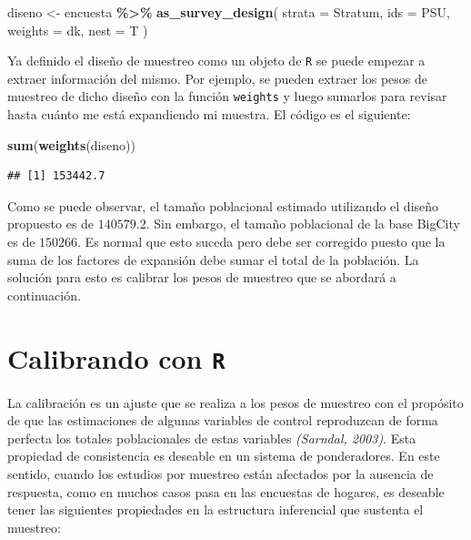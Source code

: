 \documentclass[
  spanish,
  12pt,
]{book}
\newenvironment{Shaded}{\begin{snugshade}}{\end{snugshade}}
\newcommand{\AttributeTok}[1]{\textcolor[rgb]{0.13,0.29,0.53}{#1}}
\newcommand{\FunctionTok}[1]{\textcolor[rgb]{0.13,0.29,0.53}{\textbf{#1}}}
\newcommand{\NormalTok}[1]{#1}
\newcommand{\OtherTok}[1]{\textcolor[rgb]{0.56,0.35,0.01}{#1}}
\newcommand{\SpecialCharTok}[1]{\textcolor[rgb]{0.81,0.36,0.00}{\textbf{#1}}}
\begin{document}
\begin{Shaded}
\begin{Highlighting}[]
\NormalTok{diseno }\OtherTok{\textless{}{-}}\NormalTok{ encuesta }\SpecialCharTok{\%\textgreater{}\%}
  \FunctionTok{as\_survey\_design}\NormalTok{(}
    \AttributeTok{strata =}\NormalTok{ Stratum,}
    \AttributeTok{ids =}\NormalTok{ PSU,}
    \AttributeTok{weights =}\NormalTok{ dk,}
    \AttributeTok{nest =}\NormalTok{ T}
\NormalTok{  )}
\end{Highlighting}
\end{Shaded}

Ya definido el diseño de muestreo como un objeto de \texttt{R} se puede empezar a extraer información del mismo. Por ejemplo, se pueden extraer los pesos de muestreo de dicho diseño con la función \texttt{weights} y luego sumarlos para revisar hasta cuánto me está expandiendo mi muestra. El código es el siguiente:

\begin{Shaded}
\begin{Highlighting}[]
\FunctionTok{sum}\NormalTok{(}\FunctionTok{weights}\NormalTok{(diseno))}
\end{Highlighting}
\end{Shaded}

\begin{verbatim}
## [1] 153442.7
\end{verbatim}

Como se puede observar, el tamaño poblacional estimado utilizando el diseño propuesto es de \(140579.2\). Sin embargo, el tamaño poblacional de la base BigCity es de \(150266\). Es normal que esto suceda pero debe ser corregido puesto que la suma de los factores de expansión debe sumar el total de la población. La solución para esto es calibrar los pesos de muestreo que se abordará a continuación.

\section{\texorpdfstring{Calibrando con \texttt{R}}{Calibrando con R}}\label{calibrando-con-r}

La calibración es un ajuste que se realiza a los pesos de muestreo con el propósito de que las estimaciones de algunas variables de control reproduzcan de forma perfecta los totales poblacionales de estas variables \emph{(Sarndal, 2003)}. Esta propiedad de consistencia es deseable en un sistema de ponderadores. En este sentido, cuando los estudios por muestreo están afectados por la ausencia de respuesta, como en muchos casos pasa en las encuestas de hogares, es deseable tener las siguientes propiedades en la estructura inferencial que sustenta el muestreo:
\end{document}
